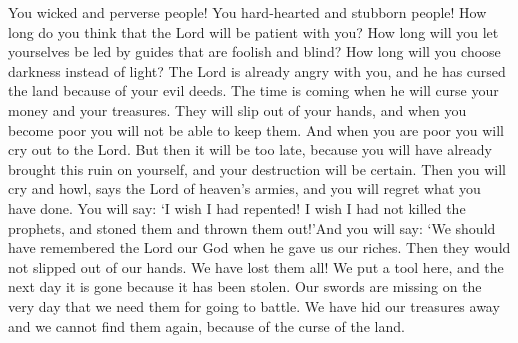You wicked and perverse people! You hard-hearted and stubborn people! How long do you think that the Lord will be patient with you? How long will you let yourselves be led by guides that are foolish and blind? How long will you choose darkness instead of light?
\bverse \iffalse Yea, behold, the anger of the Lord is already kindled against you; behold, he hath cursed the land because of your iniquity. \fi
The Lord is already angry with you, and he has cursed the land because of your evil deeds.
\bverse \iffalse And behold, the time cometh that he curseth your riches, that they become slippery, that ye cannot hold them; and in the days of your poverty ye cannot retain them. \fi
The time is coming when he will curse your money and your treasures. They will slip out of your hands, and when you become poor you will not be able to keep them.
\bverse \iffalse And in the days of your poverty ye shall cry unto the Lord; and in vain shall ye cry, for your desolation is already come upon you, and your destruction is made sure; and then shall ye weep and howl in that day, saith the Lord of Hosts. And then shall ye lament, and say: \fi
And when you are poor you will cry out to the Lord. But then it will be too late, because you will have already brought this ruin on yourself, and your destruction will be certain. Then you will cry and howl, says the Lord of heaven's armies, and you will regret what you have done. You will say:
\bverse \iffalse O that I had repented, and had not killed the prophets, and stoned them, and cast them out. Yea, in that day ye shall say: O that we had remembered the Lord our God in the day that he gave us our riches, and then they would not have become slippery that we should lose them; for behold, our riches are gone from us. \fi
\lq I wish I had repented! I wish I had not killed the prophets, and stoned them and thrown them out!\rq And you will say: \lq We should have remembered the Lord our God when he gave us our riches. Then they would not slipped out of our hands. We have lost them all!
\bverse \iffalse Behold, we lay a tool here and on the morrow it is gone; and behold, our swords are taken from us in the day we have sought them for battle. \fi
We put a tool here, and the next day it is gone because it has been stolen. Our swords are missing on the very day that we need them for going to battle.
\bverse \iffalse Yea, we have hid up our treasures and they have slipped away from us, because of the curse of the land. \fi
We have hid our treasures away and we cannot find them again, because of the curse of the land.
